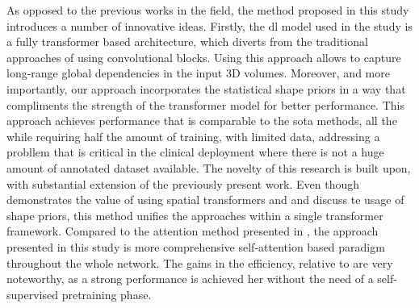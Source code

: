As opposed to the previous works in the field, the method proposed in this study introduces a number of innovative ideas. Firstly, the \gls{dl} model used in the study is a fully transformer based architecture, which diverts from the traditional approaches of using convolutional blocks. Using this approach allows to capture long-range global dependencies in the input 3D volumes. Moreover, and more importantly, our approach incorporates the statistical shape priors in a way that compliments the strength of the transformer model for better performance. This approach achieves performance that is comparable to the \gls{sota} methods, all the while requiring half the amount of training, with limited data, addressing a probllem that is critical in the clinical deployment where there is not a huge amount of annotated dataset available. The novelty of this research is built upon, with substantial extension of the previously present work. Even though \cite{10488032} demonstrates the value of using spatial transformers and and \cite{ZHU2023106954} discuss te usage of shape priors, this method unifies the approaches within a single transformer framework. Compared to the attention method presented in \cite{ZHANG2023107267}, the approach presented in this study is more comprehensive self-attention based paradigm throughout the whole network. The gains in the efficiency, relative to \cite{10.1145/3632047.3632078} are very noteworthy, as a strong performance is achieved her without the need of a self-supervised pretraining phase.
